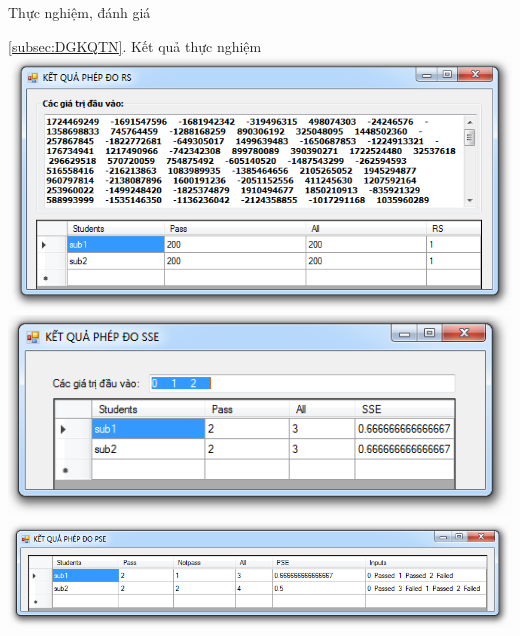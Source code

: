 \begin{frame}{Thực nghiệm, đánh giá}
\begin{block}{\ref{subsec:DGKQTN}. Kết quả thực nghiệm}
	\centering
	\includegraphics[width=0.6\linewidth]{images/kq_rs.png} \\	
	\includegraphics[width=0.6\linewidth]{images/kq_sse.png} \\
	\includegraphics[width=0.6\linewidth]{images/kq_pse.png}	
\end{block}
\end{frame}

